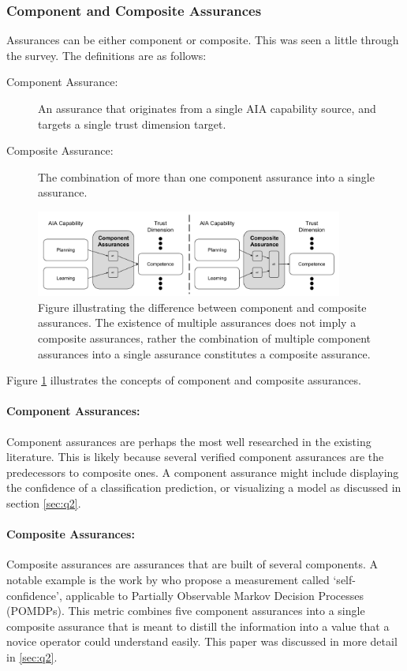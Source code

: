 \subsubsection{Component and Composite Assurances}
Assurances can be either component or composite. This was seen a little through the survey. The definitions are as follows:

\begin{description}
    \item [Component Assurance:] An assurance that originates from a single AIA capability source, and targets a single trust dimension target.
    \item [Composite Assurance:] The combination of more than one component assurance into a single assurance. 
\end{description}

\begin{figure}[!htbp]
    \centering
    \includegraphics[width=0.9\textwidth]{Figures/Assurance_component_composite.pdf}
    \caption{Figure illustrating the difference between component and composite assurances. The existence of multiple assurances does not imply a composite assurances, rather the combination of multiple component assurances into a single assurance constitutes a composite assurance.}
    \label{fig:assurance_mapping}
\end{figure}

Figure \ref{fig:assurance_mapping} illustrates the concepts of component and composite assurances.

\paragraph{Component Assurances:} Component assurances are perhaps the most well researched in the existing literature. This is likely because several verified component assurances are the predecessors to composite ones. A component assurance might include displaying the confidence of a classification prediction, or visualizing a model as discussed in section \ref{sec:q2}.

\paragraph{Composite Assurances:} Composite assurances are assurances that are built of several components. A notable example is the work by \citet{Aitken2016-cv} who propose a measurement called `self-confidence', applicable to Partially Observable Markov Decision Processes (POMDPs). This metric combines five component assurances into a single composite assurance that is meant to distill the information into a value that a novice operator could understand easily. This paper was discussed in more detail in \ref{sec:q2}. 
